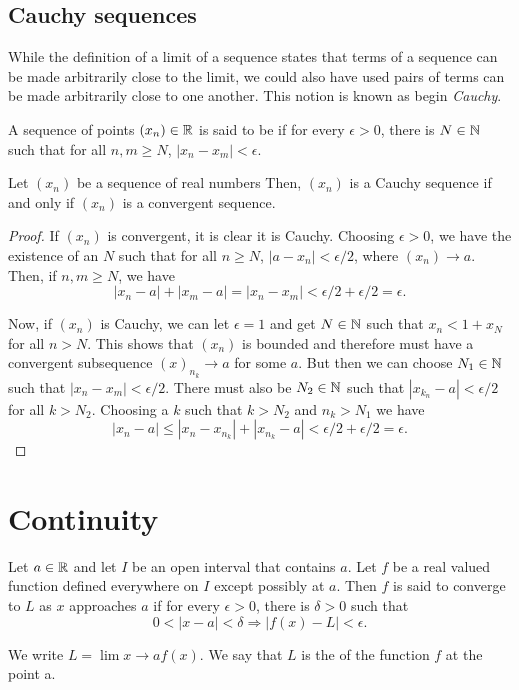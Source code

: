 \subsection{Cauchy sequences}
While the definition of a limit of a sequence states that terms of a sequence can be made arbitrarily close to the limit, we could also have used pairs of terms can be made arbitrarily close to one another. This notion is known as begin \emph{Cauchy}.

\begin{definition}
  A sequence of points \((x_{n}) \in \mathbb{R}\) is said to be  if for every \(\epsilon > 0\), there is \(N \in \mathbb{N}\) such that for all \(n, m \geq N\), \(|x_{n} - x_{m}| < \epsilon\).
\end{definition}

\begin{theorem}[Cauchy]
  \label{thm:label}
  Let \((x_{n})\) be a sequence of real numbers Then, \((x_{n})\) is a Cauchy sequence if and only if \((x_{n})\) is a convergent sequence.
\end{theorem}
\begin{proof}
  If \((x_{n})\) is convergent, it is clear it is Cauchy. Choosing \(\epsilon > 0\), we have the existence of an \(N\) such that for all \(n \geq N\), \(| a - x_{n} | < \epsilon / 2\), where \((x_{n}) \to a\). Then, if \(n,m \geq N\), we have
  \[ | x_{n} - a | + | x_{m} - a | = |x_{n} - x_{m} | < \epsilon /2 + \epsilon /2 = \epsilon.\]

  Now, if \((x_{n})\) is Cauchy, we can let \(\epsilon = 1\) and get \(N \in \mathbb{N}\) such that \(x_{n} < 1 + x_{N}\) for all \(n > N\). This shows that \((x_{n})\) is bounded and therefore must have a convergent subsequence \((x)_{n_{k}} \to a\) for some \(a\). But then we can choose \(N_{1} \in \mathbb{N}\) such that \(| x_{n} - x_{m} | < \epsilon /2\). There must also be \(N_{2} \in \mathbb{N}\) such that \(|x_{k_{n}} - a | < \epsilon / 2\) for all \(k > N_{2}\). Choosing a \(k\) such that \(k > N_{2}\) and \(n_{k} > N_{1}\) we have
  \[|x_{n} - a| \leq |x_{n} - x_{n_{k}}| + |x_{n_{k}} - a| < \epsilon /2 + \epsilon /2 = \epsilon.\]
\end{proof}

\section{Continuity}

\begin{definition}
  Let \(a \in \mathbb{R}\) and let \(I\) be an open interval that contains \(a\). Let \(f\) be a real valued function defined everywhere on \(I\) except possibly at \(a\). Then \(f\) is said to converge to \(L\) as \(x\) approaches \(a\) if for every \(\epsilon > 0\), there is \(\delta >0\) such that
  \[ 0 < | x - a | < \delta \Rightarrow | f(x) - L | < \epsilon.\]

  We write \(L = \lim{x \to a}{f(x)}\). We say that \(L\) is the  of the function \(f\) at the point a.
\end{definition}

